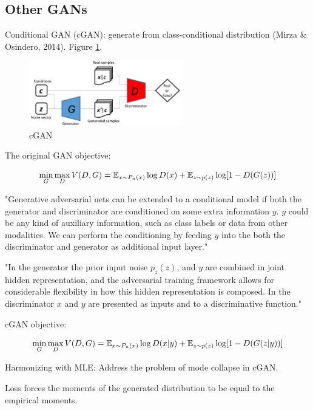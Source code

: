 \documentclass[english]{article}
\begin{document}
\eenum


\subsection{Other GANs}

\benum 
\item Conditional GAN (cGAN): generate from class-conditional distribution (Mirza \& Osindero, 2014). Figure \ref{cGAN}. 

\begin{figure}[h!]
  \centering
  \includegraphics[width=0.6\textwidth]{cgan.png}
    \caption{cGAN}
  \label{cGAN}
 \end{figure}


\item 
The original GAN objective: 

$$\min_G\max_D V(D,G) 
= \mathbb{E}_{x\sim P_n(x)}\log D(x) + 
\mathbb{E}_{z\sim p(z)} \log[1-D(G(z))] $$

"Generative adversarial nets can be extended to a conditional model if both the generator and discriminator are conditioned on some extra information $y$. $y$ could be any kind of auxiliary information,
such as class labels or data from other modalities. We can perform the conditioning by feeding $y$
into the both the discriminator and generator as additional input layer."

"In the generator the prior input noise $p_z(z)$, and $y$ are combined in joint hidden representation, and the adversarial training framework allows for considerable flexibility in how this hidden representation is composed.
In the discriminator $x$ and $y$ are presented as inputs and to a discriminative function."


cGAN objective: 

$$\min_G\max_D V(D,G) 
= \mathbb{E}_{x\sim P_n(x)}\log D(x|y) + 
\mathbb{E}_{z\sim p(z)} \log[1-D(G(z|y))] $$


\item 

Harmonizing with MLE: Address the problem of mode collapse in cGAN. 

Loss forces the moments of the generated distribution to be equal to the empirical moments. 
\end{document}
